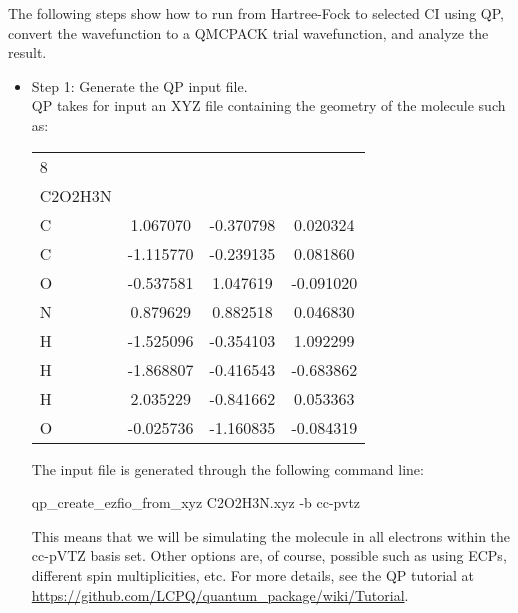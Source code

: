 The following steps show how to run from Hartree-Fock to selected CI using QP, convert the wavefunction to a QMCPACK trial wavefunction, and analyze the result.

\begin{itemize}
\item Step 1: Generate the QP input file.\\
QP takes for input an XYZ file containing the geometry of the molecule such as:

\begin{center}
\begin{tabular}{ l c c c }
8\\
C2O2H3N\\
C &       1.067070 &  -0.370798 &   0.020324\\
C &      -1.115770 &  -0.239135 &   0.081860\\
O &      -0.537581 &   1.047619 &  -0.091020\\
N &       0.879629 &   0.882518 &   0.046830\\
H &      -1.525096 &  -0.354103 &   1.092299\\
H &      -1.868807 &  -0.416543 &  -0.683862\\
H &       2.035229 &  -0.841662 &   0.053363\\
O &      -0.025736 &  -1.160835 &  -0.084319   
\end{tabular}
\end{center}

The input file is generated through the following command line:\\

\begin{shade}
qp_create_ezfio_from_xyz C2O2H3N.xyz -b cc-pvtz 
\end{shade}

 
This means that we will be simulating the molecule in all electrons within the cc-pVTZ basis set. Other options are, of course, possible such as using ECPs, different spin multiplicities, etc. For more details, see the QP tutorial at \url{https://github.com/LCPQ/quantum_package/wiki/Tutorial}.


\end{itemize}
